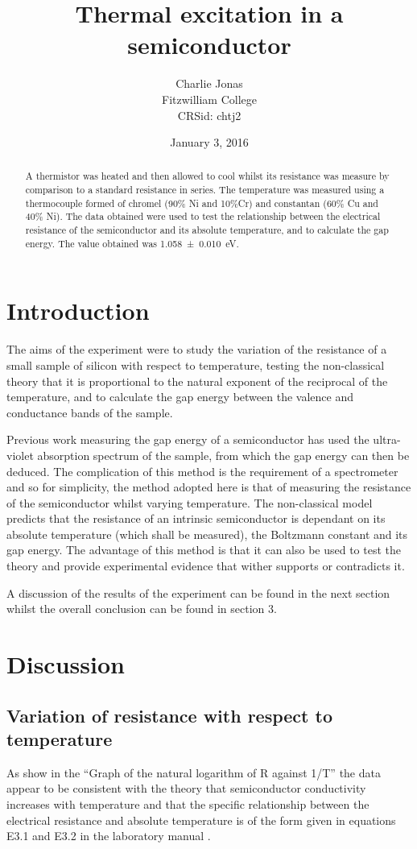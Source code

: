 \documentclass[12pt]{article}
\title{Thermal excitation in a semiconductor}
\author{Charlie Jonas\\Fitzwilliam College\\CRSid: chtj2}
\date{January 3, 2016}
\begin{document}
\maketitle

\begin{abstract}
A thermistor was heated and then allowed to cool whilst its resistance was measure by comparison to a standard resistance in series. The temperature was measured using a thermocouple formed of chromel (90\% Ni and 10\%Cr) and constantan (60\% Cu and 40\% Ni). The data obtained were used to test the relationship between the electrical resistance of the semiconductor and its absolute temperature, and to calculate the gap energy. The value obtained was \SI{1.058 \pm 0.010}{\electronvolt}.
\end{abstract}

\section{Introduction}
The aims of the experiment were to study the variation of the resistance of a small sample of silicon with respect to temperature, testing the non-classical theory that it is proportional to the natural exponent of the reciprocal of the temperature, and to calculate the gap energy between the valence and conductance bands of the sample.

Previous work measuring the gap energy of a semiconductor has used the ultra-violet absorption spectrum of the sample, from which the gap energy can then be deduced. The complication of this method is the requirement of a spectrometer and so for simplicity, the method adopted here is that of measuring the resistance of the semiconductor whilst varying temperature. The non-classical model predicts that the resistance of an intrinsic semiconductor is dependant on its absolute temperature (which shall be measured), the Boltzmann constant and its gap energy. The advantage of this method is that it can also be used to test the theory and provide experimental evidence that wither supports or contradicts it.

A discussion of the results of the experiment can be found in the next section whilst the overall conclusion can be found in section 3.

\section{Discussion}

\subsection{Variation of resistance with respect to temperature}
As show in the ``Graph of the natural logarithm of R against 1/T'' the data appear to be consistent with the theory that semiconductor conductivity increases with temperature and that the specific relationship between the electrical resistance and absolute temperature is of the form given in equations E3.1 and E3.2 in the laboratory manual \cite{labmanual}.
\end{document}
